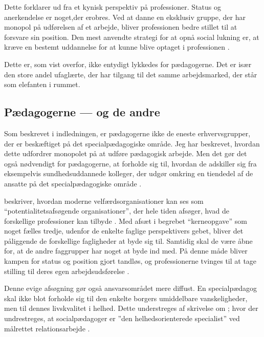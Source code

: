 Dette forklarer \citeauthor{frederiksenVelfaerdsprofessionerMellemOmsorg2017} ud fra et kynisk perspektiv på professioner.
Status og anerkendelse er noget,der erobres.
Ved at danne en eksklusiv gruppe, der har monopol på udførelsen af et arbejde, bliver professionen bedre stillet til at forsvare sin position.
Den mest anvendte strategi for at opnå social lukning er, at kræve en bestemt uddannelse for at kunne blive optaget i professionen \autocite[s. 451ff]{frederiksenVelfaerdsprofessionerMellemOmsorg2017}.

Dette er, som vist overfor, ikke entydigt lykkedes for pædagogerne.
Det er især den store andel ufaglærte, der har tilgang til det samme arbejdsmarked, der står som elefanten i rummet.

\subsection{Pædagogerne — og de andre}

Som beskrevet i indledningen, er pædagogerne ikke de eneste erhvervsgrupper, der er beskæftiget på det specialpædagogiske område.
Jeg har beskrevet, hvordan dette udfordrer monopolet på at udføre pædagogisk arbejde.
Men det gør det også nødvendigt for pædagogerne, at forholde sig til, hvordan de adskiller sig fra eksempelvis sundhedsuddannede kolleger, der udgør omkring en tiendedel af de ansatte på det specialpædagogiske område \autocite[s. 8f]{kommunerneslandsforeningFaktaOmKommunernes2019}.

\citeauthor{porsKerneloseKerneopgaverSkolen2015} beskriver, hvordan moderne velfærdsorganisationer kan ses som “potentialitetsafsøgende organisationer”, der hele tiden afsøger, hvad de forskellige professioner kan tilbyde \autocite[s 310]{porsKerneloseKerneopgaverSkolen2015}.
Med afsæt i begrebet “kerneopgave” som noget fælles tredje, udenfor de enkelte faglige perspektivers gebet, bliver det påliggende de forskellige fagligheder at byde sig til.
Samtidig skal de være åbne for, at de andre faggrupper har noget at byde ind med.
På denne måde bliver kampen for status og position gjort tandløs, og professionerne tvinges til at tage stilling til deres egen arbejdsudsførelse \autocite[s. 311 ff.]{porsKerneloseKerneopgaverSkolen2015}.

Denne evige afsøgning gør også ansvarsområdet mere diffust. En specialpædagog skal ikke blot forholde sig til den enkelte borgers umiddelbare vanskeligheder, men til dennes livskvalitet i helhed.
Dette understreges af \citeauthor{socialpaedagogerneSocialpaedagogiskeKernefaglighed2015} skrivelse om ; hvor der undrestreges, at socialpædagoger er ”den helhedsorienterede specialist” ved målrettet relationsarbejde \autocite{socialpaedagogerneSocialpaedagogiskeKernefaglighed2015}.

